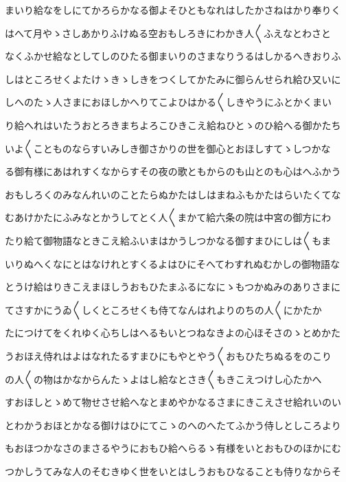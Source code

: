 \documentclass[a4paper,11pt,landscape]{ltjtarticle}
\begin{document}
\par\medskip
まいり給なをしにてかろらかなる御よそひともなれはしたかさねはかり奉りく
\par\medskip
はへて月やゝさしあかりふけぬる空おもしろきにわかき人〱ふえなとわさと
\par\medskip
なくふかせ給なとしてしのひたる御まいりのさまなりうるはしかるへきおりふ
\par\medskip
しはところせくよたけゝきゝしきをつくしてかたみに御らんせられ給ひ又いに
\par\medskip
しへのたゝ人さまにおほしかへりてこよひはかる〱しきやうにふとかくまい
\par\medskip
り給へれはいたうおとろきまちよろこひきこえ給ねひとゝのひ給へる御かたち
\par\medskip
いよ〱ことものならすいみしき御さかりの世を御心とおほしすてゝしつかな
\par\medskip
る御有様にあはれすくなからすその夜の歌ともからのも山とのも心はへふかう
\par\medskip
おもしろくのみなんれいのことたらぬかたはしはまねふもかたはらいたくてな
\par\medskip
むあけかたにふみなとかうしてとく人〱まかて給六条の院は中宮の御方にわ
\par\medskip
たり給て御物語なときこえ給ふいまはかうしつかなる御すまひにしは〱もま
\par\medskip
いりぬへくなにとはなけれとすくるよはひにそへてわすれぬむかしの御物語な
\par\medskip
とうけ給はりきこえまほしうおもひたまふるになにゝもつかぬみのありさまに
\par\medskip
てさすかにうゐ〱しくところせくも侍てなんはれよりのちの人〱にかたか
\par\medskip
たにつけてをくれゆく心ちしはへるもいとつねなきよの心ほそさのゝとめかた
\par\medskip
うおほえ侍れはよはなれたるすまひにもやとやう〱おもひたちぬるをのこり
\par\medskip
の人〱の物はかなからんたゝよはし給なとさき〱もきこえつけし心たかへ
\par\medskip
すおほしとゝめて物せさせ給へなとまめやかなるさまにきこえさせ給れいのい
\par\medskip
とわかうおほとかなる御けはひにてこゝのへのへたてふかう侍しとしころより
\par\medskip
もおほつかなさのまさるやうにおもひ給へらるゝ有様をいとおもひのほかにむ
\par\medskip
つかしうてみな人のそむきゆく世をいとはしうおもひなることも侍りなからそ
\par\medskip
\end{document}
